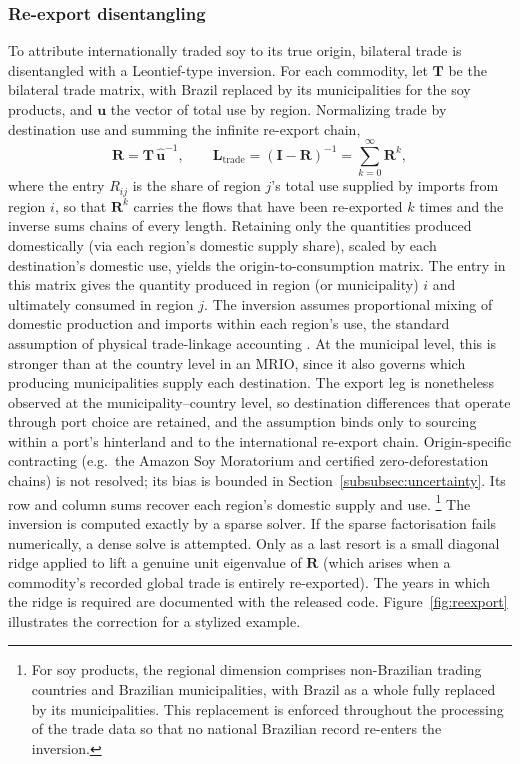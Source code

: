 \documentclass[pdflatex,sn-nature]{sn-jnl}%
\begin{document}
\subsubsection{Re-export disentangling}\label{subsubsec:reexport}
To attribute internationally traded soy to its true origin, bilateral trade is
disentangled with a Leontief-type inversion. For each commodity, let
$\mathbf{T}$ be the bilateral trade matrix, with Brazil replaced by its
municipalities for the soy products, and $\mathbf{u}$ the vector of total
use by region. Normalizing trade by destination use and summing the infinite
re-export chain,
\begin{equation}\label{eq:reex}
  \mathbf{R}=\mathbf{T}\,\hat{\mathbf{u}}^{-1},
  \qquad
  \mathbf{L}_{\mathrm{trade}}=(\mathbf{I}-\mathbf{R})^{-1}
  =\sum_{k=0}^{\infty}\mathbf{R}^{k},
\end{equation}
where the entry $R_{ij}$ is the share of region $j$'s total use supplied by
imports from region $i$, so that $\mathbf{R}^{k}$ carries the flows that
have been re-exported $k$ times and the inverse sums chains of every length.
Retaining only the quantities produced domestically (via each region's domestic supply share), scaled by each destination's domestic use, yields the origin-to-consumption matrix. The entry in this matrix gives the quantity produced in region (or municipality) $i$ and ultimately consumed in region $j$. The inversion
assumes proportional mixing of domestic production and imports within each
region's use, the standard assumption of physical trade-linkage accounting \cite{kastner2011tracing}.
At the municipal level, this is stronger than at the country level in an MRIO, since it also governs which producing municipalities supply each destination. The export leg is nonetheless observed at the municipality–country level, so destination differences that operate through port choice are retained, and the assumption binds only to sourcing within a port's hinterland and to the international re-export chain. Origin-specific contracting (e.g.\ the Amazon
Soy Moratorium and certified zero-deforestation chains) is not resolved; its
bias is bounded in Section~\ref{subsubsec:uncertainty}.
Its row and column sums recover each region's domestic supply and use.
\footnote{For soy products, the regional dimension comprises non-Brazilian trading countries and Brazilian municipalities, with Brazil as a whole fully replaced by its municipalities. This replacement is enforced throughout the processing of the trade data so that no national Brazilian record re-enters the inversion.} The inversion is computed exactly by a sparse solver. If the sparse factorisation fails numerically, a dense solve is attempted. Only as a last resort is a small diagonal ridge applied to lift a genuine unit
eigenvalue of $\mathbf{R}$ (which arises when a commodity's recorded global
trade is entirely re-exported). The years in which the ridge is required are
documented with the released code. Figure~\ref{fig:reexport} illustrates the correction for a
stylized example.
\end{document}
